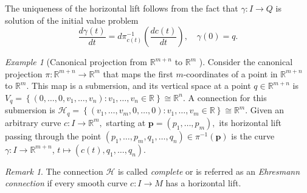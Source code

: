 \documentclass[12pt, letterpaper, reqno]{amsart}
\theoremstyle{definition}
\theoremstyle{plain}
\theoremstyle{remark}
\newtheorem{ex}{Example}
\newtheorem{rem}{Remark}
\begin{document}
The uniqueness of the horizontal lift follows from the fact that $ \gamma: I \rightarrow Q $ is solution of the initial value problem
$$ \frac{d\gamma(t)}{dt} = d\pi^{-1}_{c(t)} \left( \frac{dc(t)}{dt}  \right),\quad \gamma(0)=q.  $$ 
\begin{ex}[Canonical projection from $ \mathbb{R}^{m+n} $ to $ \mathbb{R}^m $  ]\label{ex:can_proj}
	\sloppy	Consider the canonical projection $ \pi: \mathbb{R}^{m+n} \rightarrow \mathbb{R}^m $ that maps the first $ m $-coordinates of a point in $ \mathbb{R}^{m+n} $  to $ \mathbb{R}^m. $ This map is a submersion, and its vertical space at a point $ q\in \mathbb{R}^{m+n} $ is $ V_q = \left\{ (0,\dots,0,v_1,\dots,v_n) : v_1,\dots,v_n\in \mathbb{R}  \right\} \cong \mathbb{R}^n. $ A connection for this submersion is $ \mathcal{H}_q = \left\{ (v_1,\dots,v_m, 0,\dots, 0): v_1,\dots,v_m\in \mathbb{R} \right\}\cong \mathbb{R}^m.  $ Given an arbitrary curve $ c: I \rightarrow \mathbb{R}^m, $ starting at $ \boldsymbol{p}= (p_1,\dots,p_m), $ its horizontal lift passing through the point $ (p_1,\dots,p_m,q_1,\dots,q_n)\in \pi^{-1}( \boldsymbol{p} ) $ is the curve $ \gamma: I \rightarrow \mathbb{R}^{m+n} $, $ t\mapsto (c(t),q_1,\dots,q_n). $   
\end{ex}
\begin{rem}
	The connection $ \mathcal{H} $ is called \textit{complete} or is referred as an \textit{Ehresmann connection}  if every smooth curve $ c: I \rightarrow {M} $ has a horizontal lift.
\end{rem}
\end{document}
